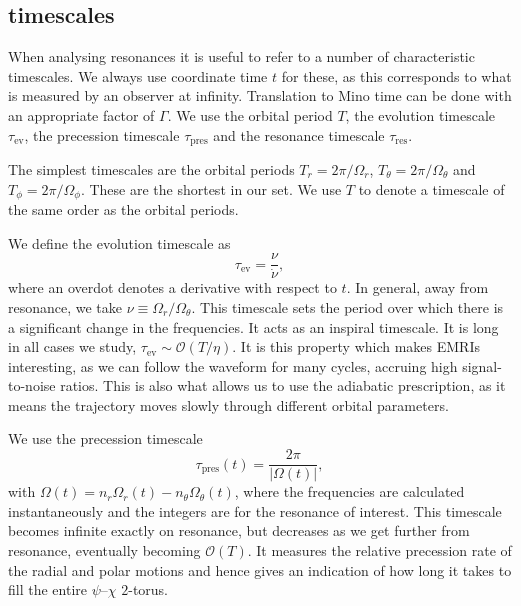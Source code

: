 \documentclass[aps,prd,amsfonts,amssymb,amsmath,nofootinbib,showpacs,superscriptaddress,twocolumn,floatfix]{revtex4-1}
\newcommand{\sub}[1]{\ensuremath{_\mathrm{#1}}}
\newcommand{\order}[1]{\ensuremath{\mathcal{O}({#1})}}
\begin{document}
\subsection{timescales}\label{sec:res-time}

When analysing resonances it is useful to refer to a number of characteristic timescales.  We always use coordinate time $t$ for these, as this corresponds to what is measured by an observer at infinity. Translation to Mino time can be done with an appropriate factor of $\Gamma$. We use the orbital period $T$, the evolution timescale $\tau\sub{ev}$, the precession timescale $\tau\sub{pres}$ and the resonance timescale $\tau\sub{res}$.

The simplest timescales are the orbital periods $T_r = 2\pi/\Omega_r$, $T_\theta = 2\pi/\Omega_\theta$ and $T_\phi = 2\pi/\Omega_\phi$. These are the shortest in our set. We use $T$ to denote a timescale of the same order as the orbital periods.

We define the evolution timescale as
\begin{equation}
\tau\sub{ev} = \frac{\nu}{\dot{\nu}},
\end{equation}
where an overdot denotes a derivative with respect to $t$. In general, away from resonance, we take $\nu \equiv \Omega_r/\Omega_\theta$. This timescale sets the period over which there is a significant change in the frequencies. It acts as an inspiral timescale. It is long in all cases we study, $\tau\sub{ev} \sim \order{T/\eta}$. It is this property which makes EMRIs interesting, as we can follow the waveform for many cycles, accruing high signal-to-noise ratios. This is also what allows us to use the adiabatic prescription, as it means the trajectory moves slowly through different orbital parameters.

We use the precession timescale
\begin{equation}
\tau\sub{pres}(t) = \frac{2\pi}{|\Omega(t)|},
\label{eq:t-pres}
\end{equation}
with $\Omega(t) = n_r \Omega_r(t) - n_\theta \Omega_\theta(t)$, where the frequencies are calculated instantaneously and the integers are for the resonance of interest. This timescale becomes infinite exactly on resonance, but decreases as we get further from resonance, eventually becoming $\order{T}$. It measures the relative precession rate of the radial and polar motions and hence gives an indication of how long it takes to fill the entire $\psi$--$\chi$ $2$-torus.
\end{document}

